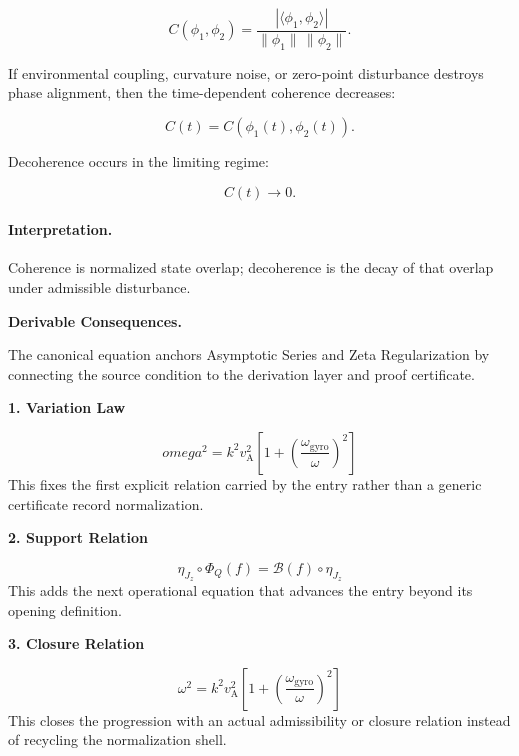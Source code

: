 \begin{equation}
C(\phi_1,\phi_2)
=
\frac{
|\langle \phi_1,\phi_2\rangle|
}{
\|\phi_1\|\,\|\phi_2\|
}.
\end{equation}

If environmental coupling, curvature noise, or zero-point disturbance destroys phase alignment, then the time-dependent coherence decreases:

\begin{equation}
C(t)
=
C(\phi_1(t),\phi_2(t)).
\end{equation}

Decoherence occurs in the limiting regime:

\begin{equation}
\boxed{
C(t)\rightarrow 0 .
}
\end{equation}

\paragraph{Interpretation.}
Coherence is normalized state overlap; decoherence is the decay of that overlap under admissible disturbance.

\par\vspace{0.35em}
\noindent\textbf{Derivable Consequences.}\quad
\begingroup
\footnotesize
\raggedright
The canonical equation anchors Asymptotic Series and Zeta Regularization by connecting the source condition to the derivation layer and proof certificate.
\par\endgroup

\noindent\textbf{1. Variation Law}\par
\[
omega^{2} = k^{2} v_{\mathrm{A}}^{2}\left[1 + \left(\frac{\omega_{\mathrm{gyro}}}{\omega}\right)^{2}\right]
\]
\noindent This fixes the first explicit relation carried by the entry rather than a generic certificate record normalization.\par
\noindent\textbf{2. Support Relation}\par
\[
\eta_{J_z}\circ\Phi_Q(f)=\mathcal{B}(f)\circ\eta_{J_z}
\]
\noindent This adds the next operational equation that advances the entry beyond its opening definition.\par
\noindent\textbf{3. Closure Relation}\par
\[
\omega^{2} = k^{2} v_{\mathrm{A}}^{2}\left[1 + \left(\frac{\omega_{\mathrm{gyro}}}{\omega}\right)^{2}\right]
\]
\noindent This closes the progression with an actual admissibility or closure relation instead of recycling the normalization shell.\par

